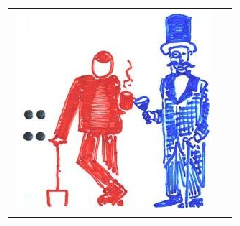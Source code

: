 \documentclass{article}
\begin{document}
\begin{tabular}{l r}
\hskip 1cm
\includegraphics[scale=0.65]{semicolon.png} &
\end{tabular}
\end{document}
